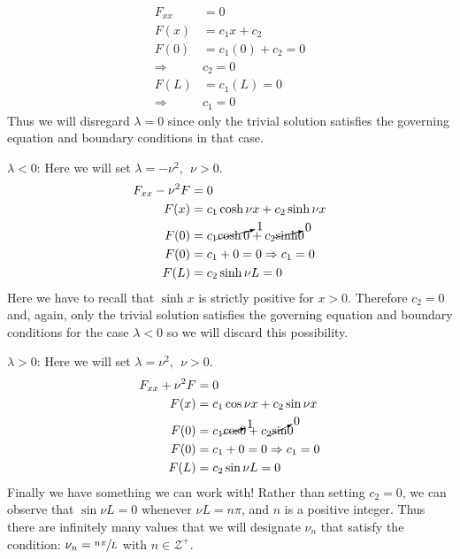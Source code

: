 \begin{align*}
F_{xx} &= 0 \\
F(x) &= c_1x + c_2 \\
F(0) &= c_1(0) + c_2 = 0 \\
\Rightarrow & c_2 = 0 \\
F(L) &= c_1(L) = 0 \\
\Rightarrow & c_1 = 0
\end{align*}
Thus we will disregard $\lambda = 0$ since only the trivial solution satisfies the governing equation and boundary conditions in that case.

\vspace{0.25cm}

\noindent\underline{$\lambda < 0$}:  Here we will set $\lambda = -\nu^2, \ \ \nu>0$. 
\begin{align*}
F_{xx} - \nu^2 F &= 0 \\
F(x) &= c_1 \cosh{\nu x} + c_2 \sinh{\nu x} \\
F(0) &= c_1 \cancelto{1}{\cosh{0}} + c_2 \cancelto{0}\sinh{0} \\
F(0) &= c_1 + 0 = 0 \Rightarrow c_1 = 0 \\
F(L) &= c_2 \sinh{\nu L} = 0 \\
\end{align*}
Here we have to recall that $\sinh{x}$ is strictly positive for $x>0$.  Therefore $c_2 = 0$ and, again, only the trivial solution satisfies the governing equation and boundary conditions for the case $\lambda < 0$ so we will discard this possibility.

\vspace{0.25cm}

\noindent\underline{$\lambda > 0$}:  Here we will set $\lambda = \nu^2, \ \ \nu>0$.
\begin{align*}
F_{xx} + \nu^2 F &= 0 \\
F(x) &= c_1 \cos{\nu x} + c_2 \sin{\nu x} \\
F(0) &= c_1 \cancelto{1}\cos{0} + c_2 \cancelto{0}\sin{0} \\
F(0) &= c_1 + 0 = 0 \Rightarrow c_1 = 0 \\
F(L) &= c_2 \sin{\nu L} = 0
\end{align*}
Finally we have something we can work with!  Rather than setting $c_2 = 0$, we can observe that $\sin{\nu L} = 0$ whenever $\nu L = n \pi$, and $n$ is a positive integer.  Thus there are infinitely many values that we will designate $\nu_n$ that satisfy the condition: $\nu_n = \sfrac{n \pi}{L}$ with $n\in \mathcal{Z}^{+}$.


